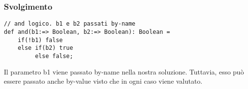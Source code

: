 \subsubsection*{Svolgimento}

\begin{lstlisting}
// and logico. b1 e b2 passati by-name 
def and(b1:=> Boolean, b2:=> Boolean): Boolean =
	if(!b1) false
	else if(b2) true
		 else false; 
\end{lstlisting}

Il parametro b1 viene passato by-name nella nostra soluzione. Tuttavia, esso pu\`o essere passato anche by-value visto che in ogni caso viene valutato. 










